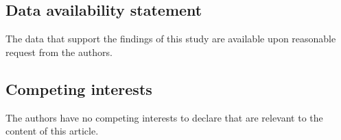 \documentclass[a4paper]{article}
\theoremstyle{Theorem}\newtheorem{proposition}{Proposition}[section]
\theoremstyle{Remark}\newtheorem{remark}{Remark}[section]
\theoremstyle{Theorem}\newtheorem{theorem}{Theorem}[section]
\begin{document}
\subsection*{Data availability statement}

The data that support the findings of this study are available upon reasonable request from the authors.



\subsection*{Competing interests}
The authors have no competing interests to declare that are relevant to the content of this article.


%

\end{document}
